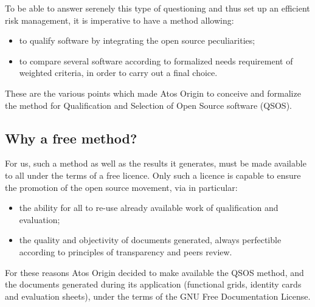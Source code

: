 To be able to answer serenely this type of questioning and thus set up an
efficient risk management, it is imperative to have a method allowing:
\begin{itemize}
\item to qualify software by integrating the open source peculiarities;
\item to compare several software according to formalized needs requirement of weighted criteria, in order to carry out a final choice.
\end{itemize}

These are the various points which made Atos Origin to conceive and formalize the method for Qualification and Selection of Open Source software (QSOS).


\subsection{Why a free method?}
For us, such a method as well as the results it generates, must be made available to all under the terms of a free licence. Only such a licence is capable to ensure the promotion of the open source movement, via in particular:
\begin{itemize}
\item the ability for all to re-use already available work of qualification and evaluation;
\item the quality and objectivity of documents generated, always perfectible according to principles of transparency and
peers review.
\end{itemize}
For these reasons Atos Origin decided to make available the QSOS method, and the documents generated during its application (functional grids, identity cards and evaluation sheets), under the terms of the GNU Free Documentation License.
